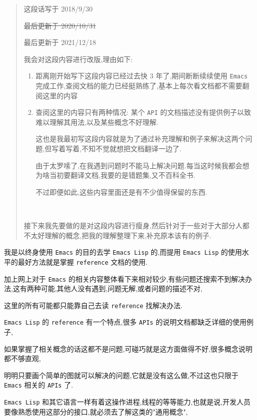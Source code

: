 \documentclass[11pt]{article}
\begin{document}
\begin{quote}
这段话写于 2018/9/30

\sout{最后更新于 2020/10/31}

最后更新于 2021/12/18

我会对这段内容进行改版,理由如下:

\begin{enumerate}
\item 距离刚开始写下这段内容已经过去快 3 年了,期间断断续续使用 \texttt{Emacs} 完成工作,查阅文档的能力已经挺熟练了,基本上每次看文档都不需要翻阅这里的内容

\item 查阅这里的内容只有两种情况: 某个 \texttt{API} 的文档描述没有提供例子以致难以理解其用法,以及某些概念不好理解.

这也是我最初写这段内容就是为了通过补充理解和例子来解决这两个问题,但写着写着,不知不觉就想把文档翻译一边了.

由于太罗嗦了,在我遇到问题时不能马上解决问题.每当这时候我都会想为啥当初要翻译文档,我要的是错题集,又不百科全书.

不过即便如此,这些内容里面还是有不少值得保留的东西.

\\[0pt]
\end{enumerate}

接下来我先要做的是对这段内容进行瘦身,然后针对于一些对于大部分人都不太好理解的概念,把我的理解整理下来,补充原本该有的例子.
\end{quote}

我是以终身使用 \texttt{Emacs} 的目的去学 \texttt{Emacs Lisp} 的,而提用 \texttt{Emacs Lisp} 的使用水平的最好方法就是掌握 \texttt{reference} 文档的使用.

加上网上对于 \texttt{Emacs} 的相关内容整体看下来相对较少,有些问题还搜索不到解决办法,这有两种可能,其他人没有遇到,问题无解,或者问题的描述不对,

这里的所有可能都只能靠自己去读 \texttt{reference} 找解决办法.

\texttt{Emacs Lisp} 的 \texttt{reference} 有一个特点,很多 \texttt{APIs} 的说明文档都缺乏详细的使用例子,

如果掌握了相关概念的话这都不是问题,可碰巧就是这方面做得不好,很多概念说明都不够直观,

明明只要画个简单的图就可以解决的问题,它就是没有这么做,不过这也只限于 \texttt{Emacs} 相关的 \texttt{APIs} 了.

\texttt{Emacs Lisp} 和其它语言一样有着这操作进程,线程的等等能力,也就是说,开发人员要像熟悉使用这部分的接口,就必须去了解这类的"通用概念",
\end{document}

